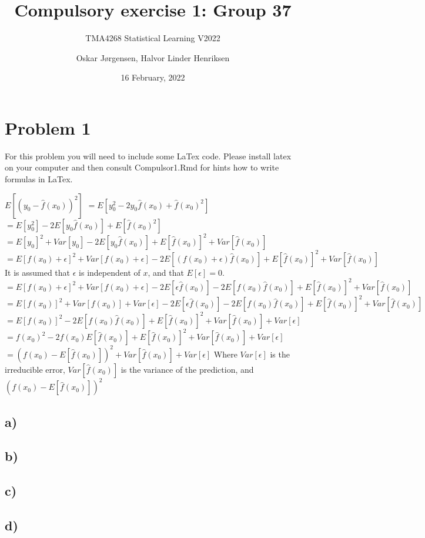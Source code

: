 \documentclass[
]{article}
\title{Compulsory exercise 1: Group 37}
\subtitle{TMA4268 Statistical Learning V2022}
\author{Oskar Jørgensen, Halvor Linder Henriksen}
\date{16 February, 2022}
\begin{document}
\maketitle

\hypertarget{problem-1}{%
\section{Problem 1}\label{problem-1}}

For this problem you will need to include some LaTex code. Please
install latex on your computer and then consult Compulsor1.Rmd for hints
how to write formulas in LaTex.

\(E[(y_0 - \hat{f}(x_0))^2]\)
\(=E[y_0^2 -2y_0 \hat{f}(x_0) + \hat{f}(x_0)^2]\)
\(=E[y_0^2] -2E[y_0 \hat{f}(x_0)] + E[\hat{f}(x_0)^2]\)
\(=E[y_0]^2 + Var[y_0] -2E[y_0 \hat{f}(x_0)] + E[\hat{f}(x_0)]^2 + Var[\hat{f}(x_0)]\)
\(=E[f(x_0) + \epsilon]^2 + Var[f(x_0) + \epsilon] -2E[(f(x_0) + \epsilon) \hat{f}(x_0)] + E[\hat{f}(x_0)]^2 + Var[\hat{f}(x_0)]\)
It is assumed that \(\epsilon\) is independent of \(x\), and that
\(E[\epsilon]=0\).
\(=E[f(x_0) + \epsilon]^2 + Var[f(x_0) + \epsilon] -2E[\epsilon \hat{f}(x_0)] - 2E[f(x_0) \hat{f}(x_0)] + E[\hat{f}(x_0)]^2 + Var[\hat{f}(x_0)]\)
\(=E[f(x_0)]^2 + Var[f(x_0)] + Var[\epsilon] -2E[\epsilon \hat{f}(x_0)] - 2E[f(x_0) \hat{f}(x_0)] + E[\hat{f}(x_0)]^2 + Var[\hat{f}(x_0)]\)
\(=E[f(x_0)]^2 - 2E[f(x_0) \hat{f}(x_0)] + E[\hat{f}(x_0)]^2 + Var[\hat{f}(x_0)] + Var[\epsilon]\)
\(=f(x_0)^2 - 2f(x_0) E[\hat{f}(x_0)] + E[\hat{f}(x_0)]^2 + Var[\hat{f}(x_0)] + Var[\epsilon]\)
\(=(f(x_0) -E[\hat{f}(x_0)])^2 + Var[\hat{f}(x_0)] + Var[\epsilon]\)
Where \(Var[\epsilon]\) is the irreducible error, \(Var[\hat{f}(x_0)]\)
is the variance of the prediction, and \((f(x_0) -E[\hat{f}(x_0)])^2\)

\hypertarget{a}{%
\subsection{a)}\label{a}}

\hypertarget{b}{%
\subsection{b)}\label{b}}

\hypertarget{c}{%
\subsection{c)}\label{c}}

\hypertarget{d}{%
\subsection{d)}\label{d}}
\end{document}
